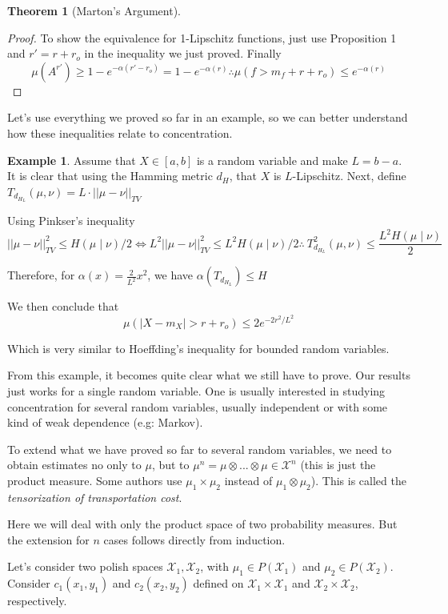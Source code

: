 \documentclass[10pt]{article}
\theoremstyle{definition}
\newtheorem{theorem}{Theorem}
\newtheorem{example}{Example}
\begin{document}
\begin{theorem}[Marton's Argument]
\begin{proof}
	To show the equivalence for 1-Lipschitz functions, just use Proposition 1 and
	$r' = r + r_o$ in the inequality we just proved. Finally
	$$
	\mu(A^{r'}) \geq 1 - e^{-\alpha(r' - r_o)} = 1 - e^{-\alpha(r)} \therefore
	\mu(f > m_f + r + r_o) \leq e^{-\alpha(r)}
	$$
\end{proof}
\end{theorem}

Let's use everything we proved so far in an example, so we can better understand how
these inequalities relate to concentration.

\begin{example}
	Assume that $X \in [a,b]$ is a random variable and make $L = b-a$. It is clear that
	using the Hamming metric $d_H$, that $X$ is $L$-Lipschitz. Next,
	define $T_{d_{H_L}}(\mu,\nu) = L \cdot || \mu - \nu||_{TV}$

	Using Pinkser's inequality
	$$
	||\mu - \nu||^2_{TV} \leq H(\mu \mid \nu)/2 \iff 
	L ^2||\mu - \nu||^2_{TV} \leq L^2 H(\mu \mid \nu)/2 \therefore \
 	T_{d_{H_L}} ^2(\mu,\nu) \leq \frac{L ^2 H(\mu \mid \nu)}{2}
	$$

	Therefore, for $\alpha(x) = \frac{2}{L^2}x^2$, we have
	$\alpha(T_{d_{H_L}}) \leq H$

	We then conclude that
	$$
	\mu(|X - m_X | > r + r_o) \leq 2 e^{- 2r^2/ L^2}
	$$

	Which is very similar to Hoeffding's inequality for bounded random variables.
\end{example}

From this example, it becomes quite clear what we still have to prove. Our results just
works for a single random variable. One is usually interested in studying concentration
for several random variables, usually independent or with some kind of weak dependence (e.g: Markov).

To extend what we have proved so far to several random variables, we need to obtain
estimates no only to $\mu$, but to $\mu^n = \mu \otimes ... \otimes \mu \in \mathcal X^n$
(this is just the product measure. Some authors use $\mu_1 \times \mu_2$ instead of
$\mu_1 \otimes \mu_2$).
This is called the \textit{tensorization of transportation cost}.

Here we will deal with only the product space of two probability measures. But the 
extension for $n$ cases follows directly from induction.

Let's consider two polish spaces $\mathcal X_1, \mathcal X_2$, with $\mu_1\in
P(\mathcal X_1)$ and $\mu_2 \in P(\mathcal X_2)$. Consider $c_1(x_1,y_1)$ and
$c_2(x_2,y_2)$ defined on
$\mathcal X_1 \times \mathcal X_1$ and
$\mathcal X_2 \times \mathcal X_2$, respectively.


  
  
\end{document}
